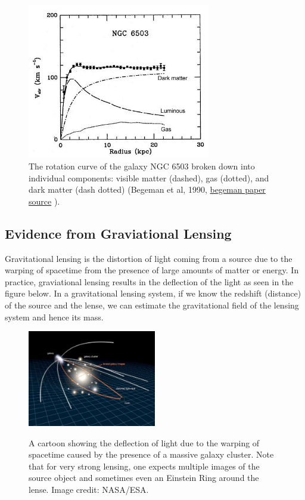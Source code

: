 \documentclass[12pt,twoside]{report}
\begin{document}
\begin{figure}[h]
\includegraphics[width=8cm]{ngc_6503_rotation_curve}
\centering
\caption{The rotation curve of the galaxy NGC 6503 broken down into individual components: visible matter (dashed), gas (dotted), and dark matter (dash dotted) (Begeman et al, 1990, \href{http://adsabs.harvard.edu/full/1991MNRAS.249..523B}{begeman paper source}	). }
\end{figure}


\subsection{Evidence from Graviational Lensing}	

Gravitational lensing is the distortion of light coming from a source due to the warping of spacetime from the presence of large amounts of matter or energy.  In practice, graviational lensing results in the deflection of the light as seen in the figure below.  In a gravitational lensing system, if we know the redshift (distance) of the source and the lense, we can estimate the gravitational field of the lensing system and hence its mass.

\begin{figure}
	\centering
	\caption{A cartoon showing the deflection of light due to the warping of spacetime caused by the presence of a massive galaxy cluster.  Note that for very strong lensing, one expects multiple images of the source object and sometimes even an Einstein Ring around the lense. Image credit: NASA/ESA.}
	\includegraphics[width=0.5\textwidth]{gravitation_lensing_cartoon}
	\label{fig:gravitation_lensing_cartoon}
\end{figure}
\end{document}

